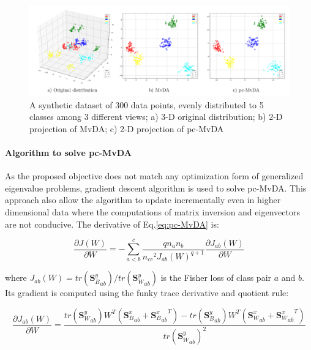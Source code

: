         \begin{figure}[htbp]
            \centering
            \includegraphics[width=1\linewidth]{Figs/Synthetic2.png}
            \caption{A synthetic dataset of 300 data points, evenly distributed to 5 classes among 3 different views; a) 3-D original distribution; b) 2-D projection of MvDA; c) 2-D projection of pc-MvDA}
            \label{fig:synthetic2}
        \end{figure}

    \paragraph{Algorithm to solve pc-MvDA}
        As the proposed objective does not match any optimization form of generalized eigenvalue problems, gradient descent algorithm is used to solve pc-MvDA. This approach also allow the algorithm to update incrementally even in higher dimensional data where the computations of matrix inversion and eigenvectors are not conducive. The derivative of Eq.\eqref{eq:pc-MvDA} is:

        \begin{equation}
            \frac{\partial J\left(W\right)}{\partial W}=-\sum_{a<b}^{c}{\frac{qn_an_b}{{n_{cc}}^2{J_{ab}\left(W\right)}^{q+1}}\frac{\partial J_{ab}\left(W\right)}{\partial W}}
        \end{equation}

        where $J_{ab}\left(W\right)={tr\left({\boldsymbol{S}_B^y}_{ab}\right)}/{tr\left({\boldsymbol{S}_W^y}_{ab}\right)}$ is the Fisher loss of class pair $a$ and $b$. Its gradient is computed using the funky trace derivative and quotient rule:

        \begin{equation}
            \frac{\partial J_{ab}\left(W\right)}{\partial W}=\frac{tr\left({\boldsymbol{S}_W^y}_{ab}\right)W^T\left({\boldsymbol{S}_B^x}_{ab}+{{\boldsymbol{S}_B^x}_{ab}}^T\right)-tr\left({\boldsymbol{S}_B^y}_{ab}\right)W^T\left({\boldsymbol{S}_W^x}_{ab}+{{\boldsymbol{S}_W^x}_{ab}}^T\right)}{{tr\left({\boldsymbol{S}_W^y}_{ab}\right)}^2}
            \label{eq:grad_Jab}
        \end{equation}

